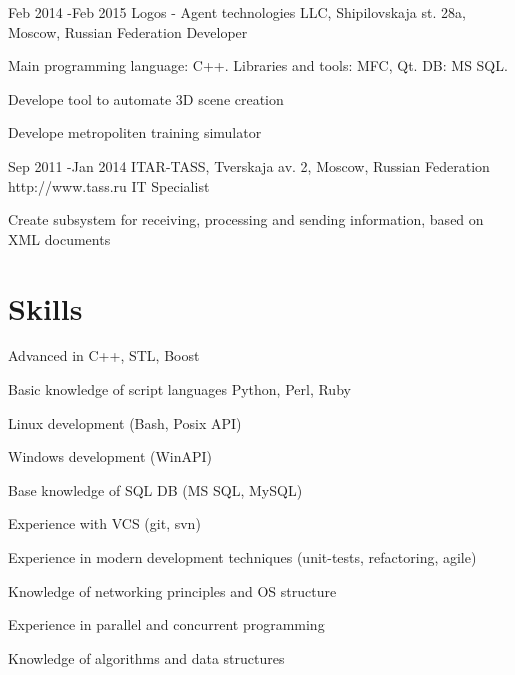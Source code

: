\documentclass[10pt]{article} %
\begin{document}

\job
{Feb 2014 -}{Feb 2015}
{Logos - Agent technologies LLC, Shipilovskaja st. 28a, Moscow, Russian Federation}
{}
{Developer}
{
Main programming language: C++. Libraries and tools: MFC, Qt. DB: MS SQL.
\begin{itemize-noindent}
\setlength\itemsep{0em}
\item{Develope tool to automate 3D scene creation}
\item{Develope metropoliten training simulator}
\end{itemize-noindent}
}


\job
{Sep 2011 -}{Jan 2014}
{ITAR-TASS, Tverskaja av. 2, Moscow, Russian Federation}
{http://www.tass.ru}
{IT Specialist}
{
\begin{itemize-noindent}
\setlength\itemsep{0em}
\item{Create subsystem for receiving, processing and sending information, based on XML documents}
\end{itemize-noindent}
}


\section{Skills}

\begin{multicols}{2}
\begin{itemize-noindent}
\setlength\itemsep{0em}
\item Advanced in C++, STL, Boost
\item Basic knowledge of script languages Python, Perl, Ruby
\item Linux development (Bash, Posix API)
\item Windows development (WinAPI)
\item Base knowledge of SQL DB (MS SQL, MySQL)
\item Experience with VCS (git, svn)
\item Experience in modern development techniques (unit-tests, refactoring, agile)
\item Knowledge of networking principles and OS structure
\item Experience in parallel and concurrent programming
\item Knowledge of algorithms and data structures
\end{itemize-noindent}
\end{multicols}
\end{document}
